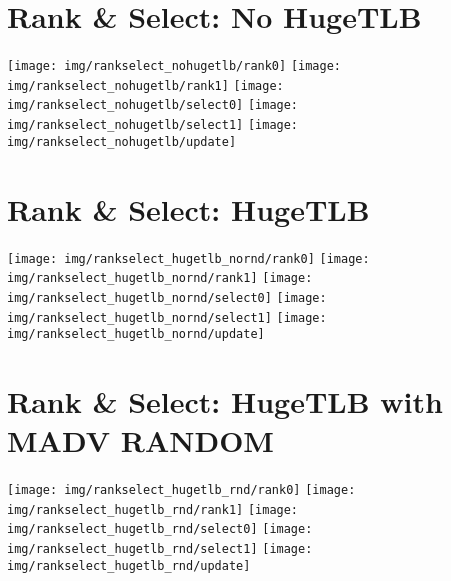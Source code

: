 \documentclass{article}
\begin{document}
\section*{Rank \& Select: No HugeTLB}

\begin{center}
\texttt{[image: img/rankselect\_nohugetlb/rank0]}
\texttt{[image: img/rankselect\_nohugetlb/rank1]}
\texttt{[image: img/rankselect\_nohugetlb/select0]}
\texttt{[image: img/rankselect\_nohugetlb/select1]}
\texttt{[image: img/rankselect\_nohugetlb/update]}
\end{center}

\section*{Rank \& Select: HugeTLB}

\begin{center}
\texttt{[image: img/rankselect\_hugetlb\_nornd/rank0]}
\texttt{[image: img/rankselect\_hugetlb\_nornd/rank1]}
\texttt{[image: img/rankselect\_hugetlb\_nornd/select0]}
\texttt{[image: img/rankselect\_hugetlb\_nornd/select1]}
\texttt{[image: img/rankselect\_hugetlb\_nornd/update]}
\end{center}

\section*{Rank \& Select: HugeTLB with MADV RANDOM}

\begin{center}
\texttt{[image: img/rankselect\_hugetlb\_rnd/rank0]}
\texttt{[image: img/rankselect\_hugetlb\_rnd/rank1]}
\texttt{[image: img/rankselect\_hugetlb\_rnd/select0]}
\texttt{[image: img/rankselect\_hugetlb\_rnd/select1]}
\texttt{[image: img/rankselect\_hugetlb\_rnd/update]}
\end{center}
\end{document}
